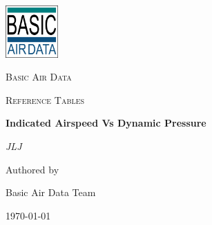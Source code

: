 \documentclass[12pt,a4paper,twoside]{article}
\author{JLJ}
\begin{document}
\begin{titlepage}
	\centering
	\includegraphics[width=0.15\textwidth]{icon.png}\par\vspace{1cm}
	{\scshape\LARGE Basic Air Data \par}
	\vspace{1cm}
	{\scshape\Large Reference Tables\par}
	\vspace{1.5cm}
	{\huge\bfseries Indicated Airspeed Vs Dynamic Pressure\par}
	\vspace{2cm}
	{\Large\itshape JLJ\par}
	\vfill
	Authored by\par
	Basic Air Data Team

	\vfill

	{\large \today\par}
\end{titlepage}
\end{document}
